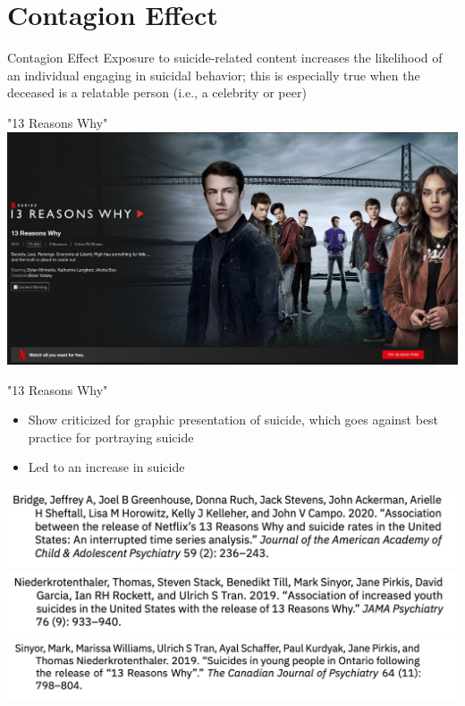 \documentclass[nobackground,dvipsnames,table,aspectratio=169]{beamer}
\begin{document}
\section{Contagion Effect}

\begin{frame}{Contagion Effect}
    \large
    Exposure to suicide-related content increases the likelihood of an individual engaging in suicidal behavior; this is especially true when the deceased is a relatable person (i.e., a celebrity or peer)
\end{frame}

\begin{frame}{"13 Reasons Why"}
    \includegraphics[width=\textwidth]{13-reasons-why-netflix}
\end{frame}

\begin{frame}{"13 Reasons Why"}
    \begin{itemize}
        \item Show criticized for graphic presentation of suicide, which goes against best practice for portraying suicide
        \item Led to an increase in suicide
    \end{itemize}
    \includegraphics[width=\textwidth]{13-reasons-why-study-1}
    \includegraphics[width=\textwidth]{13-reasons-why-study-2}
    \includegraphics[width=\textwidth]{13-reasons-why-study-3}
\end{frame}
\end{document}
